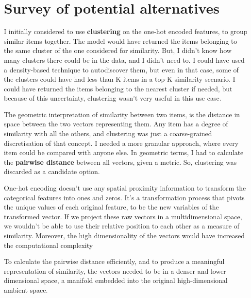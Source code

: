 
\section{Survey of potential alternatives}

I initially considered to use \textbf{clustering} on the one-hot encoded features, to group similar items together.
The model would have returned the items belonging to the same cluster of the one considered for similarity.
But, I didn't know how many clusters there could be in the data, and I didn't need to.
I could have used a density-based technique to autodiscover them,
but even in that case, some of the clusters could have had less than K items in a top-K similarity scenario.
I could have returned the items belonging to the nearest cluster if needed, but because of this uncertainty,
clustering wasn't very useful in this use case.

The geometric interpretation of similarity between two items, is the distance in space between the two vectors representing them.
Any item has a degree of similarity with all the others, and clustering was just a coarse-grained discretisation of that concept.
I needed a more granular approach, where every item could be compared with anyone else.
In geometric terms, I had to calculate the \textbf{pairwise distance} between all vectors, given a metric.
So, clustering was discarded as a candidate option.

One-hot encoding doesn't use any spatial proximity information to transform the categorical features into ones and zeros.
It's a transformation process that pivots the unique values of each original feature, to be the new variables of the transformed vector.
If we project these raw vectors in a multidimensional space, we wouldn't be able to use their
relative position to each other as a measure of similarity. Moreover, the high dimensionality of the vectors would have increased
the computational complexity

To calculate the pairwise distance efficiently, and to produce a meaningful representation of similarity, the vectors
needed to be in a denser and lower dimensional space, a manifold embedded into the original
high-dimensional ambient space.


